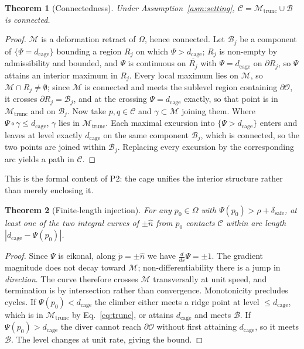 \documentclass[conference]{IEEEtran}
\newtheorem{theorem}{Theorem}
\begin{document}
\begin{theorem}[Connectedness]
\label{thm:connected}
Under Assumption~\ref{asm:setting}, $\mathcal{C}=\mathcal{M}_{\mathrm{trunc}}\cup\mathcal{B}$ is connected.
\end{theorem}
\begin{proof}
$\mathcal{M}$ is a deformation retract of $\Omega$, hence connected. Let $\mathcal{B}_j$ be a component of $\{\Psi=d_{\mathrm{cage}}\}$ bounding a region $R_j$ on which $\Psi>d_{\mathrm{cage}}$; $R_j$ is non-empty by admissibility and bounded, and $\Psi$ is continuous on $\overline{R_j}$ with $\Psi=d_{\mathrm{cage}}$ on $\partial R_j$, so $\Psi$ attains an interior maximum in $R_j$. Every local maximum lies on $\mathcal{M}$, so $\mathcal{M}\cap R_j\neq\emptyset$; since $\mathcal{M}$ is connected and meets the sublevel region containing $\partial\mathcal{O}$, it crosses $\partial R_j=\mathcal{B}_j$, and at the crossing $\Psi=d_{\mathrm{cage}}$ exactly, so that point is in $\mathcal{M}_{\mathrm{trunc}}$ and on $\mathcal{B}_j$. Now take $p,q\in\mathcal{C}$ and $\gamma\subset\mathcal{M}$ joining them. Where $\Psi\circ\gamma\le d_{\mathrm{cage}}$, $\gamma$ lies in $\mathcal{M}_{\mathrm{trunc}}$. Each maximal excursion into $\{\Psi>d_{\mathrm{cage}}\}$ enters and leaves at level exactly $d_{\mathrm{cage}}$ on the same component $\mathcal{B}_j$, which is connected, so the two points are joined within $\mathcal{B}_j$. Replacing every excursion by the corresponding arc yields a path in $\mathcal{C}$.
\end{proof}

This is the formal content of P2: the cage unifies the interior structure rather than merely enclosing it.

\begin{theorem}[Finite-length injection]
\label{thm:injection}
For any $p_0\in\Omega$ with $\Psi(p_0)>\rho+\delta_{\mathrm{safe}}$, at least one of the two integral curves of $\pm\hat{n}$ from $p_0$ contacts $\mathcal{C}$ within arc length $|d_{\mathrm{cage}}-\Psi(p_0)|$.
\end{theorem}
\begin{proof}
Since $\Psi$ is eikonal, along $\dot{p}=\pm\hat{n}$ we have $\tfrac{d}{ds}\Psi=\pm 1$. The gradient magnitude does not decay toward $\mathcal{M}$; non-differentiability there is a jump in \emph{direction}. The curve therefore crosses $\mathcal{M}$ transversally at unit speed, and termination is by intersection rather than convergence. Monotonicity precludes cycles. If $\Psi(p_0)<d_{\mathrm{cage}}$ the climber either meets a ridge point at level $\le d_{\mathrm{cage}}$, which is in $\mathcal{M}_{\mathrm{trunc}}$ by Eq.~\eqref{eq:trunc}, or attains $d_{\mathrm{cage}}$ and meets $\mathcal{B}$. If $\Psi(p_0)>d_{\mathrm{cage}}$ the diver cannot reach $\partial\mathcal{O}$ without first attaining $d_{\mathrm{cage}}$, so it meets $\mathcal{B}$. The level changes at unit rate, giving the bound.
\end{proof}
\end{document}
